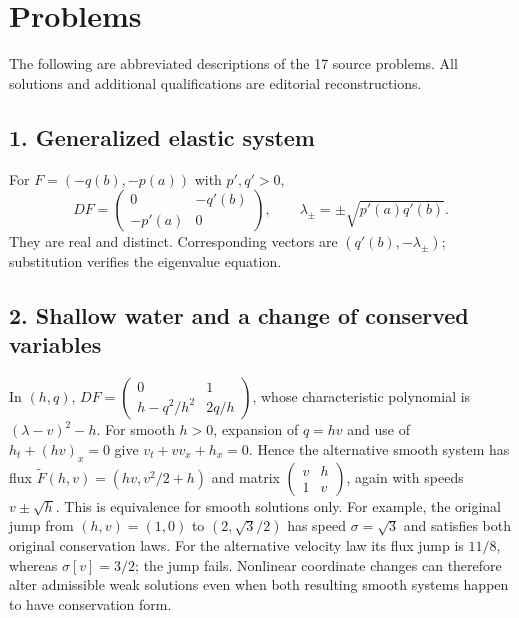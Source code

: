 \section{Problems}
\label{sec:11-5}
The following are abbreviated descriptions of the 17 source problems.
All solutions and additional qualifications are editorial reconstructions.

\subsection*{1. Generalized elastic system}
For $F=(-q(b),-p(a))$ with $p',q'>0$,
\[
 DF=\begin{pmatrix}0&-q'(b)\\-p'(a)&0\end{pmatrix},\qquad
 \lambda_\pm=\pm\sqrt{p'(a)q'(b)}.
\]
They are real and distinct. Corresponding vectors are
$(q'(b),-\lambda_\pm)$; substitution verifies the eigenvalue equation.

\subsection*{2. Shallow water and a change of conserved variables}
In $(h,q)$, $DF=\left(\begin{smallmatrix}0&1\\h-q^2/h^2&2q/h\end{smallmatrix}\right)$,
whose characteristic polynomial is $(\lambda-v)^2-h$.
For smooth $h>0$, expansion of $q=hv$ and use of
$h_t+(hv)_x=0$ give $v_t+vv_x+h_x=0$.
Hence the alternative smooth system has flux
$\widetilde F(h,v)=(hv,v^2/2+h)$ and matrix
$\left(\begin{smallmatrix}v&h\\1&v\end{smallmatrix}\right)$,
again with speeds $v\pm\sqrt h$.
This is equivalence for smooth solutions only. For example, the
original jump from $(h,v)=(1,0)$ to $(2,\sqrt3/2)$ has speed
$\sigma=\sqrt3$ and satisfies both original conservation laws.
For the alternative velocity law its flux jump is $11/8$, whereas
$\sigma[v]=3/2$; the jump fails. Nonlinear coordinate changes can
therefore alter admissible weak solutions even when both resulting
smooth systems happen to have conservation form.

